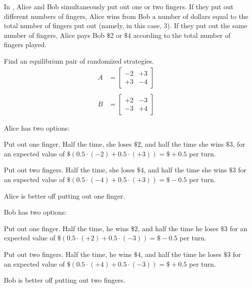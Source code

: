 \documentclass[11pt, reqno]{amsart}
\begin{document}
\begin{problem}[7]
  In \weighted, Alice and Bob simultaneously put out one or two fingers.
  If they put out different numbers of fingers,
  Alice wins from Bob a number of dollars equal to the total number of fingers
  put out (namely, in this case, 3).
  If they put out the same number of fingers, Alice pays Bob $\$2$ or $\$4$
  according to the total number of fingers played.
  
  \begin{enumalph}
    \item Find an equilibrium pair of randomized strategies. 
      \step
      \begin{align*}
        A &= \begin{bmatrix}
          -2 & +3 \\ +3 & -4
        \end{bmatrix}\\ \\
        B &= \begin{bmatrix}
          +2 & -3 \\ -3 & +4
        \end{bmatrix}
      \end{align*}

      \step
      Alice has two options:
      \begin{enumroman}
        \item Put out one finger. Half the time, she loses $\$2$,
          and half the time she wins $\$3$, for an expected value
          of $\$(0.5 \cdot (-2) + 0.5 \cdot (+3)) = \$+0.5$ per turn.
        \item Put out two fingers.
          Half the time, she loses $\$4$,
          and half the time she wins $\$3$ for an expected value of
          $\$(0.5 \cdot (-4) + 0.5 \cdot (+3)) = \$-0.5$ per turn.
      \end{enumroman}
      Alice is better off putting out one finger.

      \step
      Bob has two options:
      \begin{enumroman}
        \item Put out one finger. Half the time, he wins $\$2$,
          and half the time he loses $\$3$ for an expected value
          of $\$(0.5 \cdot (+2) + 0.5 \cdot (-3)) = \$-0.5$
          per turn.
        \item Put out two fingers.
          Half the time, he wins $\$4$,
          and half the time he loses $\$3$ for an expected value of
          $\$(0.5 \cdot (+4) + 0.5 \cdot (-3)) = \$+0.5$ per turn.
      \end{enumroman}
      Bob is better off putting out two fingers.


\end{enumalph}
\end{problem}
\end{document}
